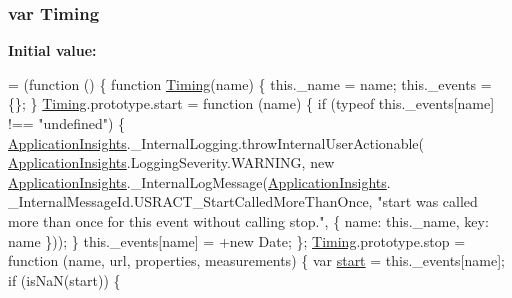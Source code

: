 \subsubsection[{\texorpdfstring{Timing}{Timing}}]{\setlength{\rightskip}{0pt plus 5cm}var Timing}\hypertarget{_scripts_2ai_80_822_89-build00167_8js_afdd3ea2c773e0e94771da9013e155095}{}\label{_scripts_2ai_80_822_89-build00167_8js_afdd3ea2c773e0e94771da9013e155095}
{\bfseries Initial value\+:}
\begin{DoxyCode}
= (\textcolor{keyword}{function} () \{
            \textcolor{keyword}{function} \hyperlink{obj_2_release_2_package_2_package_tmp_2_scripts_2ai_80_822_89-build00167_8js_afdd3ea2c773e0e94771da9013e155095}{Timing}(name) \{
                this.\_name = name;
                this.\_events = \{\};
            \}
            \hyperlink{obj_2_release_2_package_2_package_tmp_2_scripts_2ai_80_822_89-build00167_8js_afdd3ea2c773e0e94771da9013e155095}{Timing}.prototype.start = \textcolor{keyword}{function} (name) \{
                \textcolor{keywordflow}{if} (typeof this.\_events[name] !== \textcolor{stringliteral}{"undefined"}) \{
                    \hyperlink{obj_2_release_2_package_2_package_tmp_2_scripts_2ai_80_822_89-build00167_8js_aa415ef4f8cdd699689ef4b61db7656d8}{ApplicationInsights}.\_InternalLogging.throwInternalUserActionable(
      \hyperlink{obj_2_release_2_package_2_package_tmp_2_scripts_2ai_80_822_89-build00167_8js_aa415ef4f8cdd699689ef4b61db7656d8}{ApplicationInsights}.LoggingSeverity.WARNING, \textcolor{keyword}{new} 
      \hyperlink{obj_2_release_2_package_2_package_tmp_2_scripts_2ai_80_822_89-build00167_8js_aa415ef4f8cdd699689ef4b61db7656d8}{ApplicationInsights}.\_InternalLogMessage(\hyperlink{obj_2_release_2_package_2_package_tmp_2_scripts_2ai_80_822_89-build00167_8js_aa415ef4f8cdd699689ef4b61db7656d8}{ApplicationInsights}.
      \_InternalMessageId.USRACT\_StartCalledMoreThanOnce, \textcolor{stringliteral}{"start was called more than once for this event without calling
       stop."}, \{ name: this.\_name, key: name \}));
                \}
                this.\_events[name] = +\textcolor{keyword}{new} Date;
            \};
            \hyperlink{obj_2_release_2_package_2_package_tmp_2_scripts_2ai_80_822_89-build00167_8js_afdd3ea2c773e0e94771da9013e155095}{Timing}.prototype.stop = \textcolor{keyword}{function} (name, url, properties, measurements) \{
                var \hyperlink{obj_2_release_2_package_2_package_tmp_2_scripts_2jquery-1_810_82_8js_aef10902ffededd983608fdb8dbfc441a}{start} = this.\_events[name];
                \textcolor{keywordflow}{if} (isNaN(start)) \{

\end{DoxyCode}

